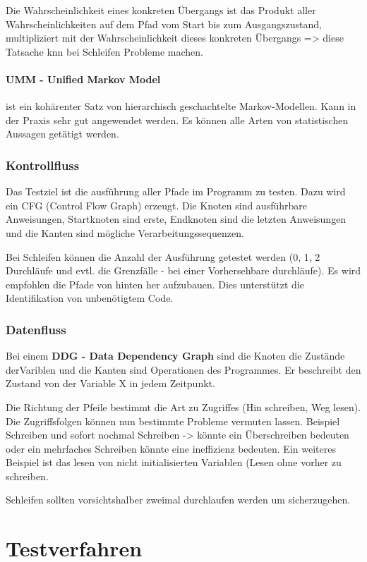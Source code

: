 Die Wahrscheinlichkeit eines konkreten Übergangs ist das Produkt aller Wahrscheinlichkeiten auf dem Pfad vom Start bis zum Ausgangszustand, multipliziert mit der Wahrscheinlichkeit dieses konkreten Übergangs => diese Tatsache knn bei Schleifen Probleme machen.

\paragraph{UMM - Unified Markov Model} ist ein kohärenter Satz von hierarchisch geschachtelte Markov-Modellen. Kann in der Praxis sehr gut angewendet werden. Es können alle Arten von statistischen Aussagen getätigt werden.

\subsubsection{Kontrollfluss}
Das Testziel ist die ausführung aller Pfade im Programm zu testen. Dazu wird ein CFG (Control Flow Graph) erzeugt. Die Knoten sind ausführbare Anweisungen, Startknoten sind erste, Endknoten sind die letzten Anweisungen und die Kanten sind mögliche Verarbeitungssequenzen.

Bei Schleifen können die Anzahl der Ausführung getestet werden (0, 1, 2 Durchläufe und evtl. die Grenzfälle - bei einer Vorhersehbare durchläufe). Es wird empfohlen die Pfade von hinten her aufzubauen. Dies unterstützt die Identifikation von unbenötigtem Code.

\subsubsection{Datenfluss}
Bei einem \textbf{DDG - Data Dependency Graph} sind die Knoten die Zustände derVariblen und die Kanten sind Operationen des Programmes. Er beschreibt den Zustand von der Variable X in jedem Zeitpunkt.

Die Richtung der Pfeile bestimmt die Art zu Zugriffes (Hin schreiben, Weg lesen). Die Zugriffsfolgen können nun bestimmte Probleme vermuten lassen.
Beispiel Schreiben und sofort nochmal Schreiben -> könnte ein Überschreiben bedeuten oder ein mehrfaches Schreiben könnte eine ineffizienz bedeuten.
Ein weiteres Beispiel ist das lesen von nicht initialisierten Variablen (Lesen ohne vorher zu schreiben.

Schleifen sollten vorsichtshalber zweimal durchlaufen werden um sicherzugehen.

\section{Testverfahren}

